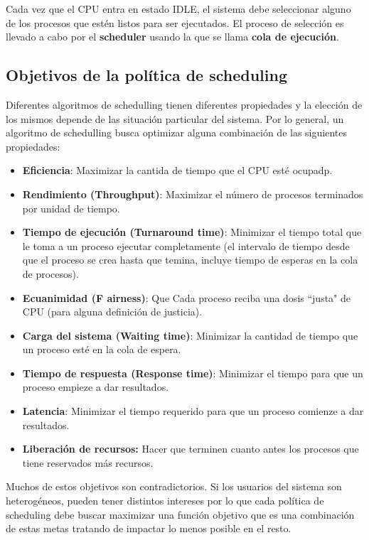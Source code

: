 	Cada vez que el CPU entra en estado IDLE, el sistema debe seleccionar alguno de los procesos que estén listos para ser ejecutados. El proceso de selección es llevado a cabo por el \textbf{scheduler} usando la que se llama \textbf{cola de ejecución}.
	
	\subsection{Objetivos de la política de scheduling}
	Diferentes algoritmos de schedulling tienen diferentes propiedades y la elección de los mismos depende de las situación particular del sistema. Por lo general, un algoritmo de schedulling busca optimizar alguna combinación de las siguientes propiedades:
	
	\begin{itemize}
		\item \textbf{Eficiencia}: Maximizar la cantida de tiempo que el CPU esté ocupadp.
		\item \textbf{Rendimiento (Throughput)}: Maximizar el número de procesos terminados por unidad de tiempo.
		\item \textbf{Tiempo de ejecución (Turnaround time)}: Minimizar el tiempo total que le toma a un proceso ejecutar completamente (el intervalo de tiempo desde que el proceso se crea hasta que temina, incluye tiempo de esperas en la cola de procesos).
		\item \textbf{Ecuanimidad (F airness)}: Que Cada proceso reciba una dosis ``justa" de CPU (para alguna definición de justicia).
		\item \textbf{Carga del sistema (Waiting time)}: Minimizar la cantidad de tiempo que un proceso esté en la cola de espera.
		\item \textbf{Tiempo de respuesta (Response time)}: Minimizar el tiempo para que un proceso empieze a dar resultados.
		\item \textbf{Latencia}: Minimizar el tiempo requerido para que un proceso comienze a dar resultados.
		
		\item \textbf{Liberación de recursos:} Hacer que terminen cuanto antes los procesos que tiene reservados más recursos.
	\end{itemize}
	Muchos de estos objetivos son contradictorios. Si los usuarios del sistema son heterogéneos, pueden tener distintos intereses por lo que cada política de scheduling debe buscar maximizar una función objetivo que es una combinación de estas metas tratando de impactar lo menos posible en el resto.
	
